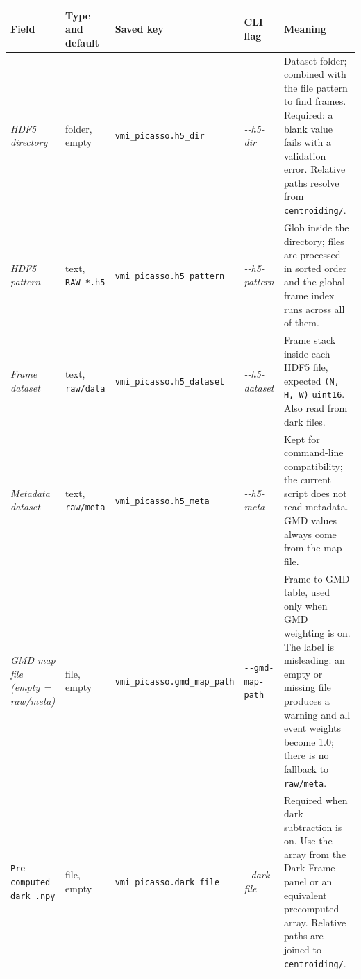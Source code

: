 \documentclass[11pt,a4paper]{article}
\newcommand{\code}[1]{\texttt{#1}}
\begin{document}
\begin{center}
\footnotesize
\begin{longtable}{@{}L{3.4cm}L{2.3cm}L{2.5cm}L{2.8cm}L{4.9cm}@{}}
\toprule
Field & Type and default & Saved key & CLI flag & Meaning \\
\midrule
\endhead
\bottomrule
\endfoot
\emph{HDF5 directory} & folder, empty & \code{vmi\_\allowbreak{}picasso.\allowbreak{}h5\_\allowbreak{}dir} &
\emph{-\allowbreak{}-\allowbreak{}h5-\allowbreak{}dir} & Dataset folder; combined with the file pattern to find
frames. Required: a blank value fails with a validation error. Relative
paths resolve from \code{centroiding/\allowbreak{}}. \\
\addlinespace
\emph{HDF5 pattern} & text, \code{RAW-\allowbreak{}*.\allowbreak{}h5} & \code{vmi\_\allowbreak{}picasso.\allowbreak{}h5\_\allowbreak{}pattern} &
\emph{-\allowbreak{}-\allowbreak{}h5-\allowbreak{}pattern} & Glob inside the directory; files are processed in
sorted order and the global frame index runs across all of them. \\
\addlinespace
\emph{Frame dataset} & text, \code{raw/\allowbreak{}data} & \code{vmi\_\allowbreak{}picasso.\allowbreak{}h5\_\allowbreak{}dataset} &
\emph{-\allowbreak{}-\allowbreak{}h5-\allowbreak{}dataset} & Frame stack inside each HDF5 file, expected
\code{(N, H, W)} \code{uint16}. Also read from dark files. \\
\addlinespace
\emph{Metadata dataset} & text, \code{raw/\allowbreak{}meta} & \code{vmi\_\allowbreak{}picasso.\allowbreak{}h5\_\allowbreak{}meta} &
\emph{-\allowbreak{}-\allowbreak{}h5-\allowbreak{}meta} & Kept for command-line compatibility; the current script
does not read metadata. GMD values always come from the map file. \\
\addlinespace
\emph{GMD map file (empty = raw/\allowbreak{}meta)} & file, empty &
\code{vmi\_\allowbreak{}picasso.gmd\_\allowbreak{}map\_\allowbreak{}path} & \code{-\allowbreak{}-\allowbreak{}gmd-\allowbreak{}map-\allowbreak{}path} & Frame-to-GMD table,
used only when GMD weighting is on. The label is misleading: an empty or
missing file produces a warning and all event weights become 1.0; there is
no fallback to \code{raw/\allowbreak{}meta}. \\
\addlinespace
\code{Pre-\allowbreak{}computed dark .npy} & file, empty & \code{vmi\_\allowbreak{}picasso.\allowbreak{}dark\_\allowbreak{}file} &
\emph{-\allowbreak{}-\allowbreak{}dark-\allowbreak{}file} & Required when dark subtraction is on. Use the array from
the Dark Frame panel or an equivalent precomputed array. Relative paths are joined to \code{centroiding/\allowbreak{}}. \\

\end{longtable}
\end{center}
\end{document}

